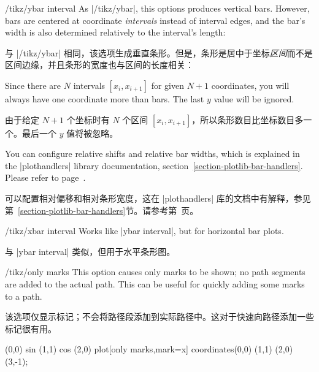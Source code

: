 \begin{key}{/tikz/ybar interval}
    As |/tikz/ybar|, this options produces vertical bars. However, bars are
    centered at coordinate \emph{intervals} instead of interval edges, and the
    bar's width is also determined relatively to the interval's length:
    
    与 |/tikz/ybar| 相同，该选项生成垂直条形。但是，条形是居中于坐标\emph{区间}而不是区间边缘，并且条形的宽度也与区间的长度相关：

\begin{codeexample}[]
\end{codeexample}
    Since there are $N$ intervals $[x_i,x_{i+1}]$ for given $N+1$ coordinates,
    you will always have one coordinate more than bars. The last $y$ value will
    be ignored.

    由于给定 $N+1$ 个坐标时有 $N$ 个区间 $[x_i,x_{i+1}]$，所以条形数目比坐标数目多一个。最后一个 $y$ 值将被忽略。

    You can configure relative shifts and relative bar widths, which is
    explained in the |plothandlers| library documentation,
    section~\ref{section-plotlib-bar-handlers}. Please refer to
    page~\pageref{key-bar-interval-width}.

    可以配置相对偏移和相对条形宽度，这在 |plothandlers| 库的文档中有解释，参见第~\ref{section-plotlib-bar-handlers}节。请参考第~\pageref{key-bar-interval-width}页。

\end{key}

\begin{key}{/tikz/xbar interval}
    Works like |ybar interval|, but for horizontal bar plots.
    
    与 |ybar interval| 类似，但用于水平条形图。


\begin{codeexample}[]
\end{codeexample}
\end{key}

\begin{key}{/tikz/only marks}
    This option causes only marks to be shown; no path segments are added to
    the actual path. This can be useful for quickly adding some marks to a
    path.

    该选项仅显示标记；不会将路径段添加到实际路径中。这对于快速向路径添加一些标记很有用。

\begin{codeexample}[]
\tikz \draw (0,0) sin (1,1) cos (2,0)
  plot[only marks,mark=x] coordinates{(0,0) (1,1) (2,0) (3,-1)};
\end{codeexample}
\end{key}
 